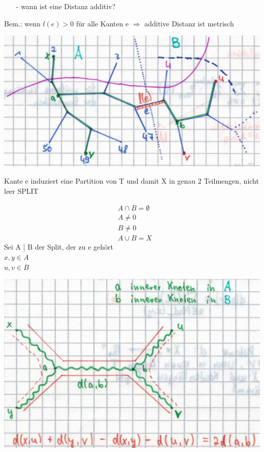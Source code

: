 \newpage

\begin{itemize}
	\item[-] wann ist eine Distanz additiv?
\end{itemize}

Bem.: wenn $l(e) > 0$ für alle Kanten e $\Rightarrow$ additive Distanz ist metrisch

\begin{center}
	\includegraphics[scale=0.6]{lectures/161209/pix/distanz_metrisch}
\end{center}

Kante e induziert eine Partition von T und damit X in genau 2 Teilmengen, nicht leer \color{purple} SPLIT \color{black}

\begin{align*}
 	&A \cap B = \emptyset \\
 	&A \neq 0 \\
 	&B \neq 0 \\
 	&A \cup B = X
\end{align*}
Sei A | B der Split, der zu e gehört\\
$x,y \in A$\\
$u,v \in B$\\

\begin{center}
	\includegraphics[scale=0.6]{lectures/161209/pix/split}
\end{center}

